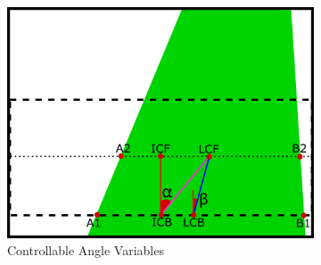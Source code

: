 \documentclass[a4paper,12pt]{article}
\begin{document}
\begin{enumerate}
\begin{itemize}
\end{itemize}	   












\begin{figure}[H]

\setlength{\unitlength}{\textwidth} 

\centering

\begin{subfigure}{.46\textwidth}

\centering

\includegraphics[width=0.45\unitlength]{images/ang_cont}

\caption{\label{fig:ang-cont} Controllable Angle Variables }

\end{subfigure}%
\begin{subfigure}{.46\textwidth}

\centering


\end{subfigure}
\end{figure}
\end{enumerate}
\end{document}
